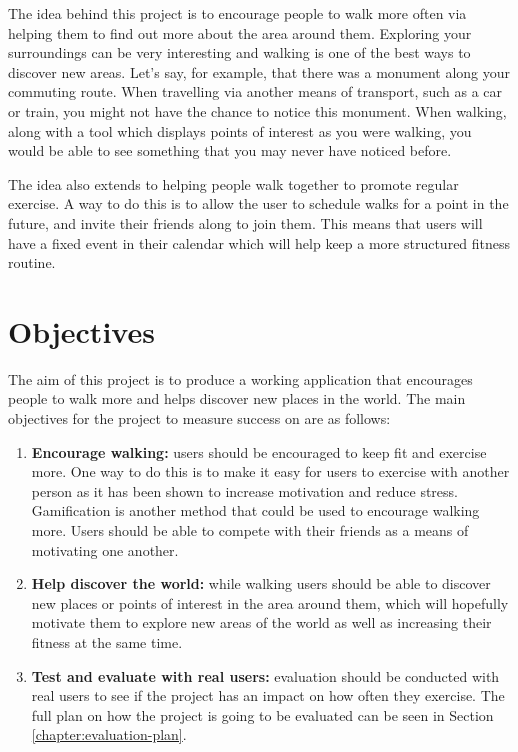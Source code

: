 The idea behind this project is to encourage people to walk more often via helping them to find out more about the area around them. Exploring your surroundings can be very interesting and walking is one of the best ways to discover new areas. Let's say, for example, that there was a monument along your commuting route. When travelling via another means of transport, such as a car or train, you might not have the chance to notice this monument. When walking, along with a tool which displays points of interest as you were walking, you would be able to see something that you may never have noticed before.

The idea also extends to helping people walk together to promote regular exercise. A way to do this is to allow the user to schedule walks for a point in the future, and invite their friends along to join them. This means that users will have a fixed event in their calendar which will help keep a more structured fitness routine.


\section{Objectives} \label{section:objectives}

The aim of this project is to produce a working application that encourages people to walk more and helps discover new places in the world. The main objectives for the project to measure success on are as follows:

\begin{enumerate}[label=\textbf{Obj \arabic*}]
  \item \textbf{Encourage walking:} users should be encouraged to keep fit and exercise more.  One way to do this is to make it easy for users to exercise with another person as it has been shown to increase motivation and reduce stress. Gamification is another method that could be used to encourage walking more. Users should be able to compete with their friends as a means of motivating one another.
  \item \textbf{Help discover the world:} while walking users should be able to discover new places or points of interest in the area around them, which will hopefully motivate them to explore new areas of the world as well as increasing their fitness at the same time.
  \item \textbf{Test and evaluate with real users:} evaluation should be conducted with real users to see if the project has an impact on how often they exercise. The full plan on how the project is going to be evaluated can be seen in Section \ref{chapter:evaluation-plan}.
\end{enumerate}







